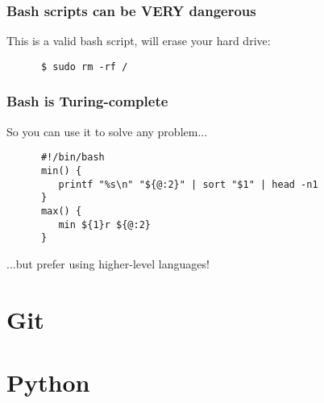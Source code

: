 \begin{frame}[fragile]
   \frametitle{Bash scripts can be VERY dangerous}
   This is a valid bash script, will erase your hard drive:
   \begin{verbatim}
      $ sudo rm -rf /
   \end{verbatim}
\end{frame}

\begin{frame}[fragile]
   \frametitle{Bash is Turing-complete}
   So you can use it to solve any problem...
   \begin{verbatim}
      #!/bin/bash
      min() {
         printf "%s\n" "${@:2}" | sort "$1" | head -n1
      }
      max() {
         min ${1}r ${@:2}
      }
   \end{verbatim}
   ...but prefer using higher-level languages!
\end{frame}

\section{Git}
\section{Python}


